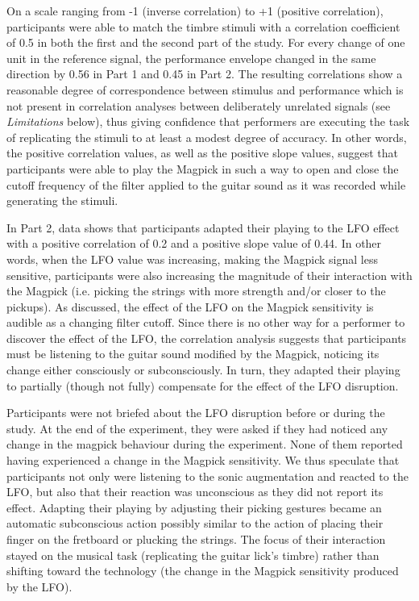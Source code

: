 \documentclass[sigconf]{nimeart}
\begin{document}
On a scale ranging from -1 (inverse correlation) to +1 (positive correlation), participants were able to match the timbre stimuli with a correlation coefficient of 0.5 in both the first and the second part of the study. For every change of one unit in the reference signal, the performance envelope changed in the same direction by 0.56 in Part 1 and 0.45 in Part 2. The resulting correlations show a reasonable degree of correspondence between stimulus and performance which is not present in correlation analyses between deliberately unrelated signals (see \emph{Limitations} below), thus giving confidence that performers are executing the task of replicating the stimuli to at least a modest degree of accuracy. In other words, the positive correlation values, as well as the positive slope values, suggest that participants were able to play the Magpick in such a way to open and close the cutoff frequency of the filter applied to the guitar sound as it was recorded while generating the stimuli.

In Part 2, data shows that participants adapted their playing to the LFO effect with a positive correlation of 0.2 and a positive slope value of 0.44. In other words, when the LFO value was increasing, making the Magpick signal less sensitive, participants were also increasing the magnitude of their interaction with the Magpick (i.e. picking the strings with more strength and/or closer to the pickups). As discussed, the effect of the LFO on the Magpick sensitivity is audible as a changing filter cutoff. Since there is no other way for a performer to discover the effect of the LFO, the correlation analysis suggests that participants must be listening to the guitar sound modified by the Magpick, noticing its change either consciously or subconsciously. In turn, they adapted their playing to partially (though not fully) compensate for the effect of the LFO disruption.

Participants were not briefed about the LFO disruption before or during the study. At the end of the experiment, they were asked if they had noticed any change in the magpick behaviour during the experiment. None of them reported having experienced a change in the Magpick sensitivity. We thus speculate that participants not only were listening to the sonic augmentation and reacted to the LFO, but also that their reaction was unconscious as they did not report its effect. Adapting their playing by adjusting their picking gestures became an automatic subconscious action possibly similar to the action of placing their finger on the fretboard or plucking the strings. The focus of their interaction stayed on the musical task (replicating the guitar lick's timbre) rather than shifting toward the technology (the change in the Magpick sensitivity produced by the LFO).
\end{document}
